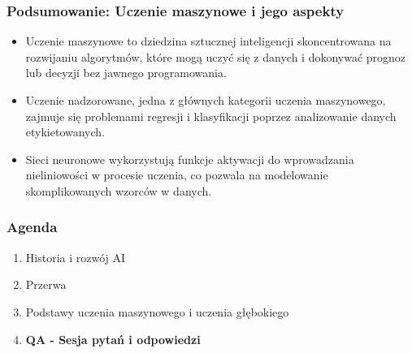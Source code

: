 \documentclass[smaller]{beamer}
\begin{document}
\begin{frame}
\frametitle{Podsumowanie: Uczenie maszynowe i jego aspekty}

\begin{itemize}
    \item Uczenie maszynowe to dziedzina sztucznej inteligencji skoncentrowana na rozwijaniu algorytmów, które mogą uczyć się z danych i dokonywać prognoz lub decyzji bez jawnego programowania.
    \item Uczenie nadzorowane, jedna z głównych kategorii uczenia maszynowego, zajmuje się problemami regresji i klasyfikacji poprzez analizowanie danych etykietowanych.
    \item Sieci neuronowe wykorzystują funkcje aktywacji do wprowadzania nieliniowości w procesie uczenia, co pozwala na modelowanie skomplikowanych wzorców w danych.
\end{itemize}

\end{frame}


\begin{frame}
\frametitle{Agenda}
\begin{enumerate}
    \item \color{gray}Historia i rozwój AI
    \item \color{gray}Przerwa
    \item \color{gray}Podstawy uczenia maszynowego i uczenia głębokiego
    \item \textbf{\color{black}QA - Sesja pytań i odpowiedzi}
\end{enumerate}
\end{frame}
\end{document}

